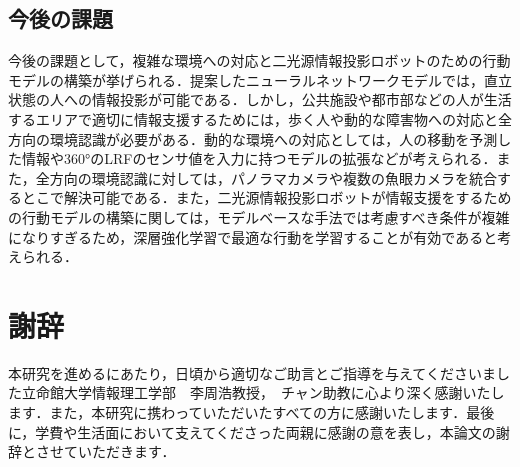 \documentclass[12pt]{sonota/aislab}
\begin{document}
\section{今後の課題}
今後の課題として，複雑な環境への対応と二光源情報投影ロボットのための行動モデルの構築が挙げられる．提案したニューラルネットワークモデルでは，直立状態の人への情報投影が可能である．しかし，公共施設や都市部などの人が生活するエリアで適切に情報支援するためには，歩く人や動的な障害物への対応と全方向の環境認識が必要がある．動的な環境への対応としては，人の移動を予測した情報や360°のLRFのセンサ値を入力に持つモデルの拡張などが考えられる．また，全方向の環境認識に対しては，パノラマカメラや複数の魚眼カメラを統合するとこで解決可能である．また，二光源情報投影ロボットが情報支援をするための行動モデルの構築に関しては，モデルベースな手法では考慮すべき条件が複雑になりすぎるため，深層強化学習で最適な行動を学習することが有効であると考えられる．

\chapter*{謝辞}
本研究を進めるにあたり，日頃から適切なご助言とご指導を与えてくださいました立命館大学情報理工学部　李周浩教授，　チャン助教に心より深く感謝いたします．また，本研究に携わっていただいたすべての方に感謝いたします．最後に，学費や生活面において支えてくださった両親に感謝の意を表し，本論文の謝辞とさせていただきます．

\end{document}
